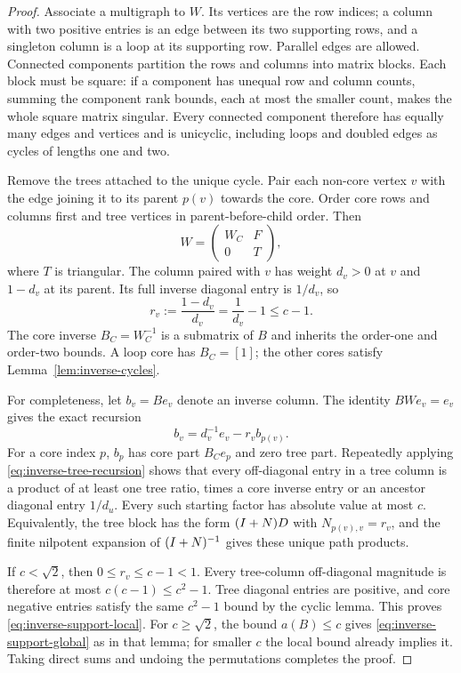 \begin{proof}
Associate a multigraph to $W$.  Its vertices are the row indices;
a column with two positive entries is an edge between its two
supporting rows, and a singleton column is a loop at its supporting
row.  Parallel edges are allowed.  Connected components partition
the rows and columns into matrix blocks.  Each block must be square:
if a component has unequal row and column counts, summing the
component rank bounds, each at most the smaller count, makes the
whole square matrix singular.  Every connected component therefore
has equally many edges and vertices and is unicyclic, including
loops and doubled edges as cycles of lengths one and two.

Remove the trees attached to the unique cycle.  Pair each non-core
vertex $v$ with the edge joining it to its parent $p(v)$ towards
the core.  Order core rows and columns first and tree vertices in
parent-before-child order.  Then
\[
 W=\begin{pmatrix}W_C&F\\0&T\end{pmatrix},
\]
where $T$ is triangular.  The column paired with $v$ has weight
$d_v>0$ at $v$ and $1-d_v$ at its parent.  Its full inverse diagonal
entry is $1/d_v$, so
\begin{equation}
 r_v:=\frac{1-d_v}{d_v}=\frac1{d_v}-1\leq c-1.
 \label{eq:inverse-tree-ratio}
\end{equation}
The core inverse $B_C=W_C^{-1}$ is a submatrix of $B$ and inherits
the order-one and order-two bounds.  A loop core has $B_C=[1]$;
the other cores satisfy Lemma~\ref{lem:inverse-cycles}.

For completeness, let $b_v=B e_v$ denote an inverse column.  The
identity $BW e_v=e_v$ gives the exact recursion
\begin{equation}
 b_v=d_v^{-1}e_v-r_v b_{p(v)}.
 \label{eq:inverse-tree-recursion}
\end{equation}
For a core index $p$, $b_p$ has core part $B_Ce_p$ and zero tree
part.  Repeatedly applying \eqref{eq:inverse-tree-recursion} shows
that every off-diagonal entry in a tree column is a product of at
least one tree ratio, times a core inverse entry or an ancestor
diagonal entry $1/d_u$.  Every such starting factor has absolute
value at most $c$.  Equivalently, the tree block has the form
$(I+N)D$ with $N_{p(v),v}=r_v$, and the finite nilpotent expansion
of $(I+N)^{-1}$ gives these unique path products.

If $c<\sqrt2$, then $0\leq r_v\leq c-1<1$.  Every tree-column
off-diagonal magnitude is therefore at most
$c(c-1)\leq c^2-1$.  Tree diagonal entries are positive, and core
negative entries satisfy the same $c^2-1$ bound by the cyclic
lemma.  This proves \eqref{eq:inverse-support-local}.  For
$c\geq\sqrt2$, the bound $a(B)\leq c$ gives
\eqref{eq:inverse-support-global} as in that lemma; for smaller
$c$ the local bound already implies it.  Taking direct sums and
undoing the permutations completes the proof.
\end{proof}

